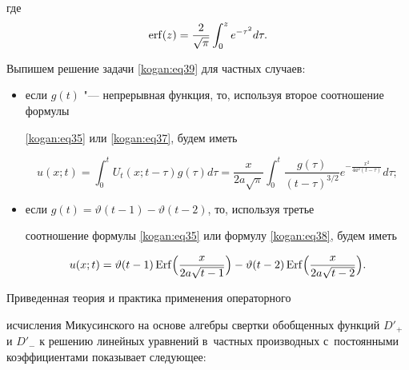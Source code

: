где $$\mathop{\rm erf} ( z )=\frac{2}{\sqrt \pi }\int _0^z e^{-\tau ^2}d\tau.$$



Выпишем решение задачи  \eqref{kogan:eq39} для частных случаев:

\begin{itemize}

 

\item [а)] если $g(t)$ "--- непрерывная функция, то, используя второе соотношение формулы 

\eqref{kogan:eq35} или \eqref{kogan:eq37}, будем иметь

\[

u(x;t)=\int_0^t U_t (x;t-\tau )g(\tau )d\tau  =\frac{x}{2a\sqrt \pi 

}\int _0^t \frac{g(\tau )}{(t-\tau )^{3/2 }} e^{-\frac{x^2}{4a^2(t-\tau )}}d\tau;

\]



\item [б)] если $g(t)=\vartheta (t-1)-\vartheta (t-2)$, то, используя третье 

соотношение формулы \eqref{kogan:eq35} или формулу \eqref{kogan:eq38}, будем иметь

\[

u(x;t)=\vartheta (t-1)\mathop{\rm Erf}\Bigl( \frac{x} {2a \sqrt {t-1} }\Bigr)-\vartheta (t-2)

\mathop{\rm Erf} \Bigl(\frac x {2a\sqrt {t-2}} \Bigr).

\]





\end{itemize}



\smallskip




Приведенная теория и практика применения операторного 

исчисления Микусинского на основе алгебры свертки обобщенных функций $D'_+$ и $D'_-$ к решению линейных уравнений в~частных производных с~постоянными коэффициентами показывает следующее:



